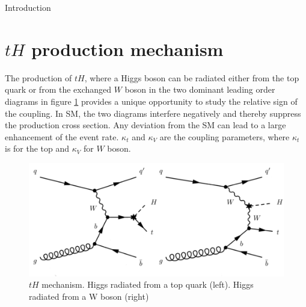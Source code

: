 \begin{chapter}{Introduction}
\section{$tH$ production mechanism}
The production of $tH$, where a Higgs boson can be radiated
either from the top quark or from the exchanged $W$ boson in the two dominant leading order
diagrams in figure \ref{newth} provides a unique opportunity to study the relative sign of the coupling.
In SM, the two diagrams interfere negatively and thereby suppress the production cross section.
Any deviation from the SM can lead to a large enhancement of the event rate.
 $\kappa_t$ and $\kappa_V$ are the coupling parameters, where $\kappa_t$ is for the top and $\kappa_V$ for $W$ boson. \\

\begin{figure}[ht]
	\centering
	\includegraphics[scale=0.5]{Chapter1/newtHq.png}
	\caption[$tH$ mechanism. Higgs radiated from a top quark (left). Higgs radiated from a W boson (right)]{$tH$ mechanism. Higgs radiated from a top quark (left). Higgs radiated from a W boson (right) \protect \cite{bb}} \label{newth}
\end{figure}
\pagebreak



\end{chapter}













